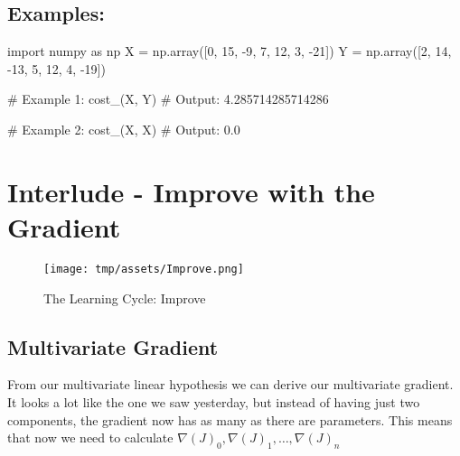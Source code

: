\documentclass[]{article}
\newenvironment{Shaded}{\begin{snugshade}}{\end{snugshade}}
\newcommand{\CommentTok}[1]{\textcolor[rgb]{0.48,0.49,0.49}{#1}}
\newcommand{\DecValTok}[1]{\textcolor[rgb]{0.96,0.45,0.00}{#1}}
\newcommand{\FloatTok}[1]{\textcolor[rgb]{0.96,0.45,0.00}{#1}}
\newcommand{\ImportTok}[1]{\textcolor[rgb]{0.15,0.68,0.38}{#1}}
\newcommand{\NormalTok}[1]{\textcolor[rgb]{0.81,0.81,0.76}{#1}}
\newcommand{\OperatorTok}[1]{\textcolor[rgb]{0.81,0.81,0.76}{#1}}
\begin{document}
\hypertarget{examples-3}{%
\subsection{Examples:}\label{examples-3}}

\begin{Shaded}
\begin{Highlighting}[]
\ImportTok{import}\NormalTok{ numpy }\ImportTok{as}\NormalTok{ np}
\NormalTok{X }\OperatorTok{=}\NormalTok{ np.array([}\DecValTok{0}\NormalTok{, }\DecValTok{15}\NormalTok{, }\DecValTok{-9}\NormalTok{, }\DecValTok{7}\NormalTok{, }\DecValTok{12}\NormalTok{, }\DecValTok{3}\NormalTok{, }\DecValTok{-21}\NormalTok{])}
\NormalTok{Y }\OperatorTok{=}\NormalTok{ np.array([}\DecValTok{2}\NormalTok{, }\DecValTok{14}\NormalTok{, }\DecValTok{-13}\NormalTok{, }\DecValTok{5}\NormalTok{, }\DecValTok{12}\NormalTok{, }\DecValTok{4}\NormalTok{, }\DecValTok{-19}\NormalTok{])}

\CommentTok{# Example 1:}
\NormalTok{cost_(X, Y)}
\CommentTok{# Output:}
\FloatTok{4.285714285714286}

\CommentTok{# Example 2:}
\NormalTok{cost_(X, X)}
\CommentTok{# Output:}
\FloatTok{0.0}
\end{Highlighting}
\end{Shaded}

\clearpage

\hypertarget{interlude---improve-with-the-gradient-1}{%
\section{Interlude - Improve with the
Gradient}\label{interlude---improve-with-the-gradient-1}}

\begin{figure}
\centering
\texttt{[image: tmp/assets/Improve.png]}
\caption{The Learning Cycle: Improve}
\end{figure}

\hypertarget{multivariate-gradient}{%
\subsection{Multivariate Gradient}\label{multivariate-gradient}}

From our multivariate linear hypothesis we can derive our multivariate
gradient. It looks a lot like the one we saw yesterday, but instead of
having just two components, the gradient now has as many as there are
parameters. This means that now we need to calculate
\(\nabla(J)_0,\nabla(J)_1,\dots,\nabla(J)_n\)
\end{document}
